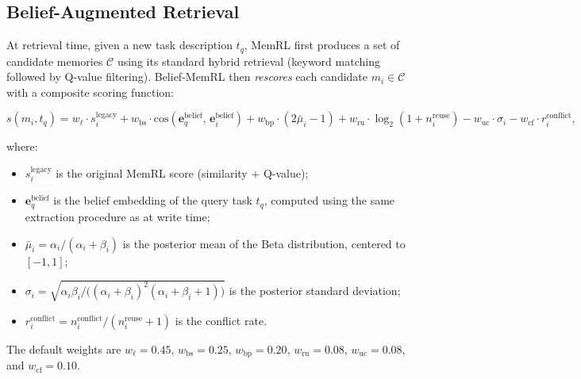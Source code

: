\subsection{Belief-Augmented Retrieval}
\label{sec:belief-retrieval}

At retrieval time, given a new task description $t_q$, MemRL first produces a set of candidate memories $\mathcal{C}$ using its standard hybrid retrieval (keyword matching followed by Q-value filtering). Belief-MemRL then \emph{rescores} each candidate $m_i \in \mathcal{C}$ with a composite scoring function:

\begin{equation}
\label{eq:belief-score}
  s(m_i, t_q) =
    w_{\ell} \cdot s_i^{\mathrm{legacy}}
  + w_{\mathrm{bs}} \cdot \mathrm{cos}\!\left(\mathbf{e}_q^{\mathrm{belief}},\, \mathbf{e}_i^{\mathrm{belief}}\right)
  + w_{\mathrm{bp}} \cdot (2\bar{\mu}_i - 1)
  + w_{\mathrm{ru}} \cdot \log_2(1 + n_i^{\mathrm{reuse}})
  - w_{\mathrm{uc}} \cdot \sigma_i
  - w_{\mathrm{cf}} \cdot r_i^{\mathrm{conflict}},
\end{equation}

where:
\begin{itemize}
  \item $s_i^{\mathrm{legacy}}$ is the original MemRL score (similarity $+$ Q-value);
  \item $\mathbf{e}_q^{\mathrm{belief}}$ is the belief embedding of the query task $t_q$, computed using the same extraction procedure as at write time;
  \item $\bar{\mu}_i = \alpha_i / (\alpha_i + \beta_i)$ is the posterior mean of the Beta distribution, centered to $[-1, 1]$;
  \item $\sigma_i = \sqrt{\alpha_i \beta_i / \bigl((\alpha_i + \beta_i)^2 (\alpha_i + \beta_i + 1)\bigr)}$ is the posterior standard deviation;
  \item $r_i^{\mathrm{conflict}} = n_i^{\mathrm{conflict}} / (n_i^{\mathrm{reuse}} + 1)$ is the conflict rate.
\end{itemize}

The default weights are $w_{\ell} = 0.45$, $w_{\mathrm{bs}} = 0.25$, $w_{\mathrm{bp}} = 0.20$, $w_{\mathrm{ru}} = 0.08$, $w_{\mathrm{uc}} = 0.08$, and $w_{\mathrm{cf}} = 0.10$.

